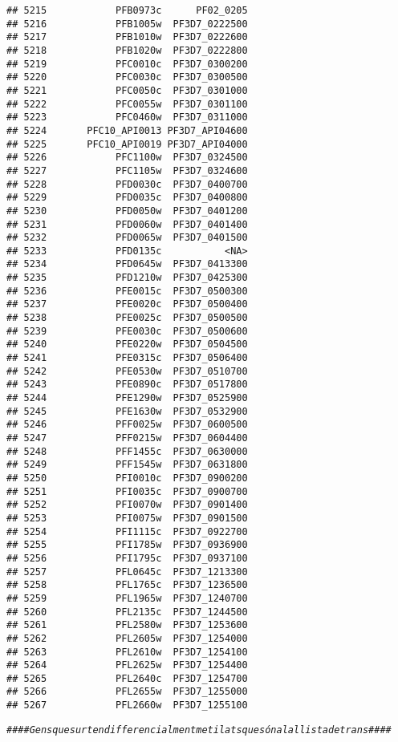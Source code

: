 \documentclass[12pt, a4paper]{article}\usepackage[]{graphicx}\usepackage[]{color}
\makeatletter
\newcommand{\hlcom}[1]{\textcolor[rgb]{0.678,0.584,0.686}{\textit{#1}}}%
\newenvironment{kframe}{%
 \def\at@end@of@kframe{}%
 \ifinner\ifhmode%
  \def\at@end@of@kframe{\end{minipage}}%
  \begin{minipage}{\columnwidth}%
 \fi\fi%
 \def\FrameCommand##1{\hskip\@totalleftmargin \hskip-\fboxsep
 \colorbox{shadecolor}{##1}\hskip-\fboxsep
     \hskip-\linewidth \hskip-\@totalleftmargin \hskip\columnwidth}%
 \MakeFramed {\advance\hsize-\width
   \@totalleftmargin\z@ \linewidth\hsize
   \@setminipage}}%
 {\par\unskip\endMakeFramed%
 \at@end@of@kframe}
\newenvironment{knitrout}{}{} %
\makeatother
\begin{document}
\begin{knitrout}
\begin{kframe}
\begin{verbatim}
## 5215            PFB0973c      PF02_0205
## 5216            PFB1005w  PF3D7_0222500
## 5217            PFB1010w  PF3D7_0222600
## 5218            PFB1020w  PF3D7_0222800
## 5219            PFC0010c  PF3D7_0300200
## 5220            PFC0030c  PF3D7_0300500
## 5221            PFC0050c  PF3D7_0301000
## 5222            PFC0055w  PF3D7_0301100
## 5223            PFC0460w  PF3D7_0311000
## 5224       PFC10_API0013 PF3D7_API04600
## 5225       PFC10_API0019 PF3D7_API04000
## 5226            PFC1100w  PF3D7_0324500
## 5227            PFC1105w  PF3D7_0324600
## 5228            PFD0030c  PF3D7_0400700
## 5229            PFD0035c  PF3D7_0400800
## 5230            PFD0050w  PF3D7_0401200
## 5231            PFD0060w  PF3D7_0401400
## 5232            PFD0065w  PF3D7_0401500
## 5233            PFD0135c           <NA>
## 5234            PFD0645w  PF3D7_0413300
## 5235            PFD1210w  PF3D7_0425300
## 5236            PFE0015c  PF3D7_0500300
## 5237            PFE0020c  PF3D7_0500400
## 5238            PFE0025c  PF3D7_0500500
## 5239            PFE0030c  PF3D7_0500600
## 5240            PFE0220w  PF3D7_0504500
## 5241            PFE0315c  PF3D7_0506400
## 5242            PFE0530w  PF3D7_0510700
## 5243            PFE0890c  PF3D7_0517800
## 5244            PFE1290w  PF3D7_0525900
## 5245            PFE1630w  PF3D7_0532900
## 5246            PFF0025w  PF3D7_0600500
## 5247            PFF0215w  PF3D7_0604400
## 5248            PFF1455c  PF3D7_0630000
## 5249            PFF1545w  PF3D7_0631800
## 5250            PFI0010c  PF3D7_0900200
## 5251            PFI0035c  PF3D7_0900700
## 5252            PFI0070w  PF3D7_0901400
## 5253            PFI0075w  PF3D7_0901500
## 5254            PFI1115c  PF3D7_0922700
## 5255            PFI1785w  PF3D7_0936900
## 5256            PFI1795c  PF3D7_0937100
## 5257            PFL0645c  PF3D7_1213300
## 5258            PFL1765c  PF3D7_1236500
## 5259            PFL1965w  PF3D7_1240700
## 5260            PFL2135c  PF3D7_1244500
## 5261            PFL2580w  PF3D7_1253600
## 5262            PFL2605w  PF3D7_1254000
## 5263            PFL2610w  PF3D7_1254100
## 5264            PFL2625w  PF3D7_1254400
## 5265            PFL2640c  PF3D7_1254700
## 5266            PFL2655w  PF3D7_1255000
## 5267            PFL2660w  PF3D7_1255100
\end{verbatim}
\begin{alltt}
\hlcom{#### Gens que surten differencialment metilats que són a la llista de trans ####}


\end{alltt}
\end{kframe}
\end{knitrout}
\end{document}
